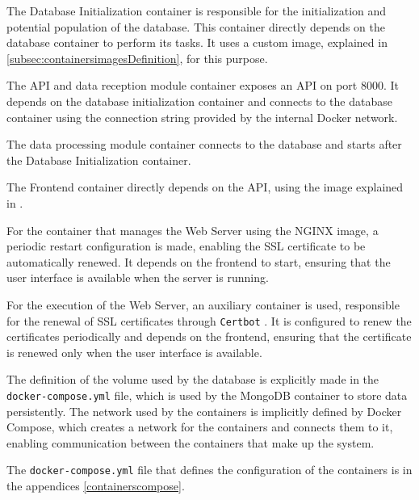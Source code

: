 The Database Initialization container is responsible for the initialization and potential population of the database. This container directly depends on the database container to perform its tasks. It uses a custom image, explained in \ref{subsec:containersimagesDefinition}, for this purpose.

The API and data reception module container exposes an API on port 8000. It depends on the database initialization container and connects to the database container using the connection string provided by the internal Docker network.

The data processing module container connects to the database and starts after the Database Initialization container.

The Frontend container directly depends on the API, using the image explained in \label{subsec:containersimages}.

For the container that manages the Web Server using the NGINX image, a periodic restart configuration is made, enabling the SSL certificate to be automatically renewed. It depends on the frontend to start, ensuring that the user interface is available when the server is running.

For the execution of the Web Server, an auxiliary container is used, responsible for the renewal of SSL certificates through \texttt{Certbot} \cite{dockerCertbot}. It is configured to renew the certificates periodically and depends on the frontend, ensuring that the certificate is renewed only when the user interface is available.

The definition of the volume used by the database is explicitly made in the \texttt{docker-compose.yml} file, which is used by the MongoDB container to store data persistently. The network used by the containers is implicitly defined by Docker Compose, which creates a network for the containers and connects them to it, enabling communication between the containers that make up the system.

The \texttt{docker-compose.yml} file that defines the configuration of the containers is in the appendices \ref{containerscompose}.